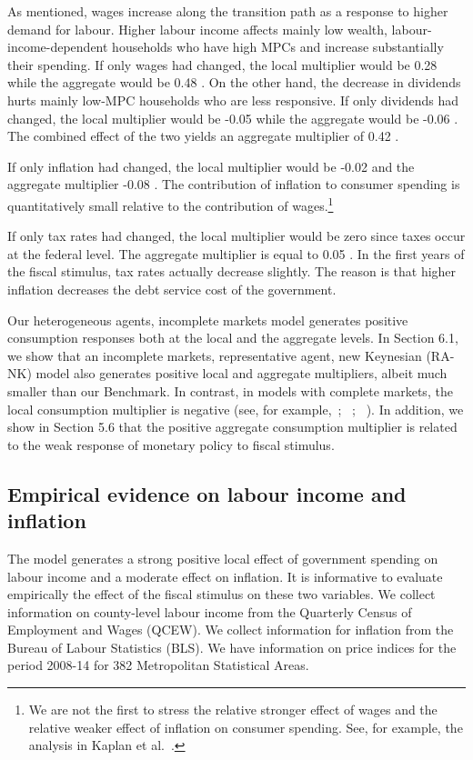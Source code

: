 \documentclass[\latexroot/\projectname]{subfiles}
\begin{document}
As mentioned, wages increase along the transition path as a response to higher demand for labour. Higher labour income affects mainly low wealth, labour-income-dependent households who have high MPCs and increase substantially their spending. If only wages had changed, the local multiplier would be 0.28 while the aggregate would be 0.48 . On the other hand, the decrease in dividends hurts mainly low-MPC households who are less responsive. If only dividends had changed, the local multiplier would be -0.05 while the aggregate would be -0.06 . The combined effect of the two yields an aggregate multiplier of 0.42 .

If only inflation had changed, the local multiplier would be -0.02 and the aggregate multiplier -0.08 . The contribution of inflation to consumer spending is quantitatively small relative to the contribution of wages.\footnote{We are not the first to stress the relative stronger effect of wages and the relative weaker effect of inflation on consumer spending. See, for example, the analysis in Kaplan et al.~\cite{Kaplan2018-sr}.}

If only tax rates had changed, the local multiplier would be zero since taxes occur at the federal level. The aggregate multiplier is equal to 0.05 . In the first years of the fiscal stimulus, tax rates actually decrease slightly. The reason is that higher inflation decreases the debt service cost of the government.

Our heterogeneous agents, incomplete markets model generates positive consumption responses both at the local and the aggregate levels. In Section 6.1, we show that an incomplete markets, representative agent, new Keynesian (RA-NK) model also generates positive local and aggregate multipliers, albeit much smaller than our Benchmark. In contrast, in models with complete markets, the local consumption multiplier is negative (see, for example,~\cite{Nakamura2011-dw}; ~\cite{Farhi2012-oe}; ~\cite{Chodorow-Reich2019-zl}). In addition, we show in Section 5.6 that the positive aggregate consumption multiplier is related to the weak response of monetary policy to fiscal stimulus.

\subsection{Empirical evidence on labour income and inflation}
The model generates a strong positive local effect of government spending on labour income and a moderate effect on inflation. It is informative to evaluate empirically the effect of the fiscal stimulus on these two variables. We collect information on county-level labour income from the Quarterly Census of Employment and Wages (QCEW). We collect information for inflation from the Bureau of Labour Statistics (BLS). We have information on price indices for the period 2008-14 for 382 Metropolitan Statistical Areas.
\end{document}
